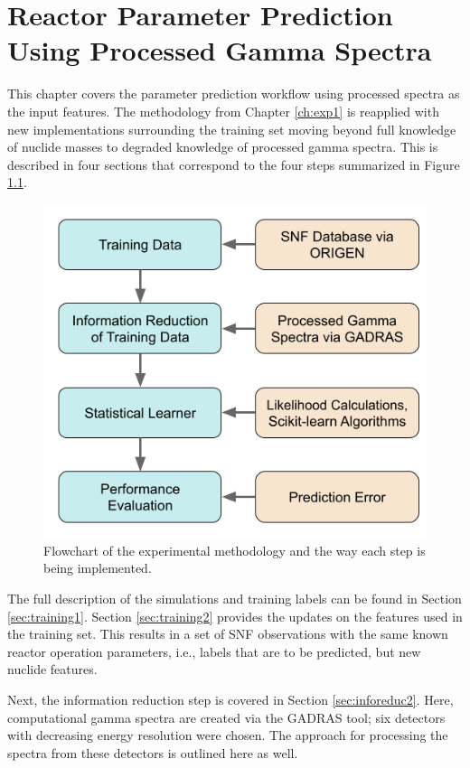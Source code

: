 
\glsresetall

\chapter{Reactor Parameter Prediction Using Processed Gamma Spectra}
\label{ch:exp2}

This chapter covers the parameter prediction workflow using processed spectra
as the input features. The methodology from Chapter \ref{ch:exp1} is reapplied
with new implementations surrounding the training set moving beyond full
knowledge of nuclide masses to degraded knowledge of processed gamma spectra.
This is described in four sections that correspond to the four steps summarized
in Figure \ref{fig:method2}.

\begin{figure}[!ht]
  \centering
  \includegraphics[width=0.7\linewidth]{./chapters/exp2/methodology2.png}
  \caption[Experimental methodology in Chapter \ref{ch:exp2}]
          {Flowchart of the experimental methodology and the way each step is 
           being implemented.}
  \label{fig:method2}
\end{figure}

The full description of the simulations and training labels can be found in
Section \ref{sec:training1}.  Section \ref{sec:training2} provides the updates
on the features used in the training set.  This results in a set of \gls{SNF}
observations with the same known reactor operation parameters, i.e., labels
that are to be predicted, but new nuclide features. 

Next, the information reduction step is covered in Section
\ref{sec:inforeduc2}.  Here, computational gamma spectra are created via the
\gls{GADRAS} tool; six detectors with decreasing energy resolution were chosen.
The approach for processing the spectra from these detectors is outlined here
as well. 

